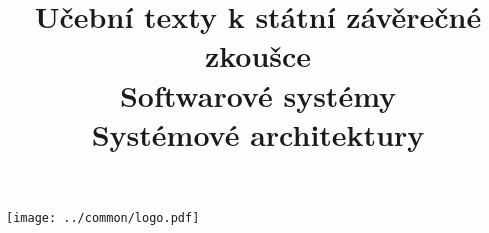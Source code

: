 \clearpage

\clearpage

\title{\LARGE Učební texty k státní závěrečné zkoušce \\ Softwarové systémy \\ Systémové architektury}




\maketitle

\vspace{10mm}
\begin{center}
\texttt{[image: ../common/logo.pdf]}
\end{center} 

\clearpage

\clearpage

\tableofcontents







